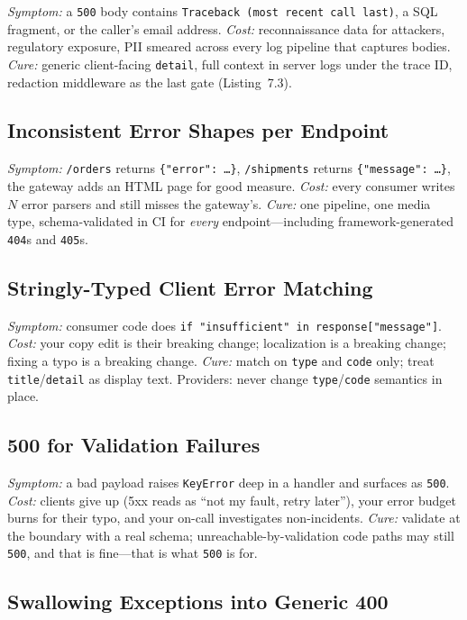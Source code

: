 \emph{Symptom:} a \texttt{500} body contains \texttt{Traceback (most recent
call last)}, a SQL fragment, or the caller's email address. \emph{Cost:}
reconnaissance data for attackers, regulatory exposure, PII smeared across
every log pipeline that captures bodies. \emph{Cure:} generic client-facing
\texttt{detail}, full context in server logs under the trace ID, redaction
middleware as the last gate (Listing~7.3).

\subsection*{Inconsistent Error Shapes per Endpoint}

\emph{Symptom:} \texttt{/orders} returns \texttt{\{"error": \ldots\}},
\texttt{/shipments} returns \texttt{\{"message": \ldots\}}, the gateway adds
an HTML page for good measure. \emph{Cost:} every consumer writes $N$ error
parsers and still misses the gateway's. \emph{Cure:} one pipeline, one media
type, schema-validated in CI for \emph{every} endpoint---including
framework-generated \texttt{404}s and \texttt{405}s.

\subsection*{Stringly-Typed Client Error Matching}

\emph{Symptom:} consumer code does
\texttt{if "insufficient" in response["message"]}. \emph{Cost:} your copy
edit is their breaking change; localization is a breaking change; fixing a
typo is a breaking change. \emph{Cure:} match on \texttt{type} and
\texttt{code} only; treat \texttt{title}/\texttt{detail} as display text.
Providers: never change \texttt{type}/\texttt{code} semantics in place.

\subsection*{500 for Validation Failures}

\emph{Symptom:} a bad payload raises \texttt{KeyError} deep in a handler and
surfaces as \texttt{500}. \emph{Cost:} clients give up (5xx reads as ``not
my fault, retry later''), your error budget burns for their typo, and your
on-call investigates non-incidents. \emph{Cure:} validate at the boundary
with a real schema; unreachable-by-validation code paths may still
\texttt{500}, and that is fine---that is what \texttt{500} is for.

\subsection*{Swallowing Exceptions into Generic 400}

